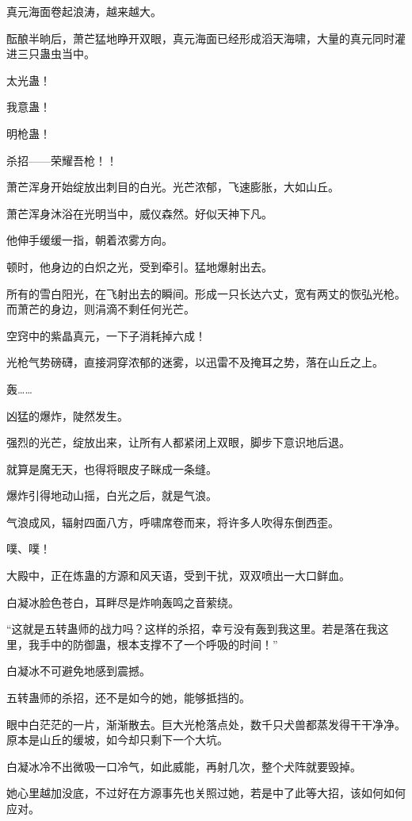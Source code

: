 \begin{this_body}
真元海面卷起浪涛，越来越大。

酝酿半晌后，萧芒猛地睁开双眼，真元海面已经形成滔天海啸，大量的真元同时灌进三只蛊虫当中。

太光蛊！

我意蛊！

明枪蛊！

杀招——荣耀吾枪！！

萧芒浑身开始绽放出刺目的白光。光芒浓郁，飞速膨胀，大如山丘。

萧芒浑身沐浴在光明当中，威仪森然。好似天神下凡。

他伸手缓缓一指，朝着浓雾方向。

顿时，他身边的白炽之光，受到牵引。猛地爆射出去。

所有的雪白阳光，在飞射出去的瞬间。形成一只长达六丈，宽有两丈的恢弘光枪。而萧芒的身边，则涓滴不剩任何光芒。

空窍中的紫晶真元，一下子消耗掉六成！

光枪气势磅礴，直接洞穿浓郁的迷雾，以迅雷不及掩耳之势，落在山丘之上。

轰……

凶猛的爆炸，陡然发生。

强烈的光芒，绽放出来，让所有人都紧闭上双眼，脚步下意识地后退。

就算是魔无天，也得将眼皮子眯成一条缝。

爆炸引得地动山摇，白光之后，就是气浪。

气浪成风，辐射四面八方，呼啸席卷而来，将许多人吹得东倒西歪。

噗、噗！

大殿中，正在炼蛊的方源和风天语，受到干扰，双双喷出一大口鲜血。

白凝冰脸色苍白，耳畔尽是炸响轰鸣之音萦绕。

“这就是五转蛊师的战力吗？这样的杀招，幸亏没有轰到我这里。若是落在我这里，我手中的防御蛊，根本支撑不了一个呼吸的时间！”

白凝冰不可避免地感到震撼。

五转蛊师的杀招，还不是如今的她，能够抵挡的。

眼中白茫茫的一片，渐渐散去。巨大光枪落点处，数千只犬兽都蒸发得干干净净。原本是山丘的缓坡，如今却只剩下一个大坑。

白凝冰冷不出微吸一口冷气，如此威能，再射几次，整个犬阵就要毁掉。

她心里越加没底，不过好在方源事先也关照过她，若是中了此等大招，该如何如何应对。


\end{this_body}
